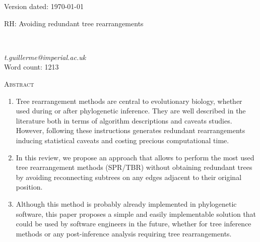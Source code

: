 \documentclass[12pt,letterpaper]{article}
\renewcommand{\section}[1]{%
\bigskip
\begin{center}
\begin{Large}
\normalfont\scshape #1
\medskip
\end{Large}
\end{center}}
\begin{document}

\begin{flushright}
Version dated: \today
\end{flushright}
\bigskip
\noindent RH: Avoiding redundant tree rearrangements

\bigskip
\medskip
\begin{center}

\bigskip

\\ %
\end{center}
\medskip
{} \textit{t.guillerme@imperial.ac.uk}\\  %
\medskip
Word count: 1213
\vspace{1in}

\modulolinenumbers[1]
\linenumbers

%
%

\newpage
\section{Abstract}
\begin{enumerate}
    \item Tree rearrangement methods are central to evolutionary biology, whether used during or after phylogenetic inference. They are well described in the literature both in terms of algorithm descriptions and caveats studies. However, following these instructions generates redundant rearrangements inducing statistical caveats and costing precious computational time.
    \item In this review, we propose an approach that allows to perform the most used tree rearrangement methods (SPR/TBR) without obtaining redundant trees by avoiding reconnecting subtrees on any edges adjacent to their original position.
    \item Although this method is probably already implemented in phylogenetic software, this paper proposes a simple and easily implementable solution that could be used by software engineers in the future, whether for tree inference methods or any post-inference analysis requiring tree rearrangements.
\end{enumerate}
\end{document}

